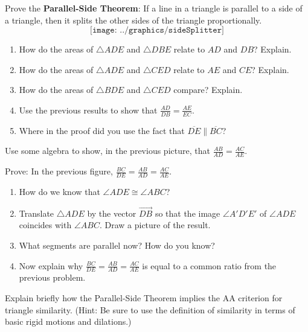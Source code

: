 \begin{prob}
Prove the \textbf{Parallel-Side Theorem}:  If a line in a triangle is parallel to a side of a triangle, then it splits the other sides of the triangle proportionally. 
$$\texttt{[image: ../graphics/sideSplitter]}$$
\begin{enumerate}
\item How do the areas of $\triangle ADE$ and $\triangle DBE$ relate to $AD$ and $DB$?  Explain.  
\item How do the areas of $\triangle ADE$ and $\triangle CED$ relate to $AE$ and $CE$?  Explain. 
\item How do the areas of $\triangle BDE$ and $\triangle CED$ compare?  Explain.  
\item Use the previous results to show that $\frac{AD}{DB} = \frac{AE}{EC}$.  
\item Where in the proof did you use the fact that $\overline{DE} \parallel \overline{BC}$?  
\end{enumerate}
\end{prob}


\begin{prob}
Use some algebra to show, in the previous picture, that $\frac{AB}{AD} = \frac{AC}{AE}$.
\end{prob}

\begin{prob}
Prove:  In the previous figure, $ \frac{BC}{DE} = \frac{AB}{AD} = \frac{AC}{AE}$.  
\begin{enumerate}
\item How do we know that $\angle ADE \cong \angle ABC$?  
\item Translate $\triangle ADE$ by the vector $\overrightarrow{DB}$ so that the image $\angle A'D'E'$ of $\angle ADE$ coincides with $\angle ABC$.  Draw a picture of the result.  
\item What segments are parallel now?  How do you know?  
\item Now explain why $\frac{BC}{DE} = \frac{AB}{AD} = \frac{AC}{AE}$ is equal to a common ratio from the previous problem.  
\end{enumerate}
\end{prob}

\begin{prob}
Explain briefly how the Parallel-Side Theorem implies the AA criterion for triangle similarity.  (Hint: Be sure to use the definition of similarity in terms of basic rigid motions and dilations.)  
\end{prob}

